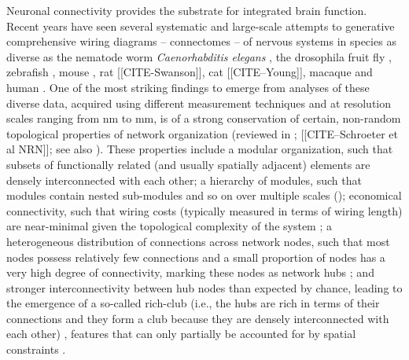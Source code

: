 \documentclass[10pt,letterpaper]{article}
\begin{document}
Neuronal connectivity provides the substrate for integrated brain function.
Recent years have seen several systematic and large-scale attempts to generative comprehensive wiring diagrams -- connectomes -- of nervous systems in species as diverse as the nematode worm \emph{Caenorhabditis elegans} \cite{White:1986tx, Varshney2011}, the drosophila fruit fly \cite{Chiang:2011, Shih:2015cu}, zebrafish \cite{Wanner:2016ea, Hildebrand:2017iu}, mouse \cite{Oh2014, Zingg:2014el}, rat [[CITE-Swanson]], cat [[CITE--Young]], macaque \cite{Markov:2012wu, Stephan2001} and human \cite{Hagmann:2008gda, VanEssen2013a}.
One of the most striking findings to emerge from analyses of these diverse data, acquired using different measurement techniques and at resolution scales ranging from nm to mm, is of a strong conservation of certain, non-random topological properties of network organization (reviewed in \cite{Bullmore:2009iv, Bullmore:2012vl, Sporns2011,VandenHeuvel2016a}; [[CITE--Schroeter et al NRN]]; see also \cite{fornito2016book}).
These properties include a modular organization, such that subsets of functionally related (and usually spatially adjacent) elements are densely interconnected with each other;
a hierarchy of modules, such that modules contain nested sub-modules and so on over multiple scales (\cite{Meunier:2010hq, Bassett2010});
economical connectivity, such that wiring costs (typically measured in terms of wiring length) are near-minimal given the topological complexity of the system \cite{Betzel:2016jt, Bassett:2010hf};
a heterogeneous distribution of connections across network nodes, such that most nodes possess relatively few connections and a small proportion of nodes has a very high degree of connectivity, marking these nodes as network hubs \cite{vandenHeuvel:2013ge, Varshney:2011ju};
and stronger interconnectivity between hub nodes than expected by chance, leading to the emergence of a so-called rich-club (i.e., the hubs are rich in terms of their connections and they form a club because they are densely interconnected with each other) \cite{vandenHeuvel:2011he, ZamoraLopez:2010hy, deReus:2013cy, Towlson:2013gf, Shih:2015cu}, features that can only partially be accounted for by spatial constraints \cite{Henderson:2014fg, Roberts:2016il, Horvat:2016ia}.
\end{document}
